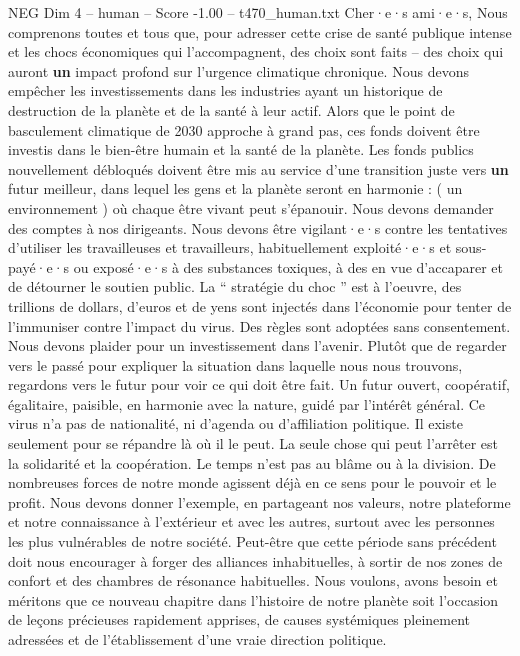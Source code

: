 \begin{textsample}{NEG Dim 4 – human – Score -1.00 – t470\_human.txt}  \label{ex:f4_neg_045}
Cher·e·s ami·e·s, Nous comprenons toutes et tous que, pour adresser cette crise de santé publique intense et les chocs économiques qui l’accompagnent, des choix sont faits – des choix qui auront \textbf{un} impact profond sur l’urgence climatique chronique.
Nous devons empêcher les investissements dans les industries ayant un historique de destruction de la planète et de la santé à leur actif.
Alors que le point de basculement climatique de 2030 approche à grand pas, ces fonds doivent être investis dans le bien-être humain et la santé de la planète.
Les fonds publics nouvellement débloqués doivent être mis au service d’une transition juste vers \textbf{un} futur meilleur, dans lequel les gens et la planète seront en harmonie : ( un environnement ) où chaque être vivant peut s’épanouir.
Nous devons demander des comptes à nos dirigeants.
Nous devons être vigilant·e·s contre les tentatives d’utiliser les travailleuses et travailleurs, habituellement exploité·e·s et sous-payé·e·s ou exposé·e·s à des substances toxiques, à des en vue d’accaparer et de détourner le soutien public.
La “ stratégie du choc ” est à l’oeuvre, des trillions de dollars, d’euros et de yens sont injectés dans l’économie pour tenter de l’immuniser contre l’impact du virus.
Des règles sont adoptées sans consentement.
Nous devons plaider pour un investissement dans l’avenir.
Plutôt que de regarder vers le passé pour expliquer la situation dans laquelle nous nous trouvons, regardons vers le futur pour voir ce qui doit être fait.
Un futur ouvert, coopératif, égalitaire, paisible, en harmonie avec la nature, guidé par l’intérêt général.
Ce virus n’a pas de nationalité, ni d’agenda ou d’affiliation politique.
Il existe seulement pour se répandre là où il le peut.
La seule chose qui peut l’arrêter est la solidarité et la coopération.
Le temps n’est pas au blâme ou à la division.
De nombreuses forces de notre monde agissent déjà en ce sens pour le pouvoir et le profit.
Nous devons donner l’exemple, en partageant nos valeurs, notre plateforme et notre connaissance à l’extérieur et avec les autres, surtout avec les personnes les plus vulnérables de notre société.
Peut-être que cette période sans précédent doit nous encourager à forger des alliances inhabituelles, à sortir de nos zones de confort et des chambres de résonance habituelles.
Nous voulons, avons besoin et méritons que ce nouveau chapitre dans l’histoire de notre planète soit l’occasion de leçons précieuses rapidement apprises, de causes systémiques pleinement adressées et de l’établissement d’une vraie direction politique.

\end{textsample}
